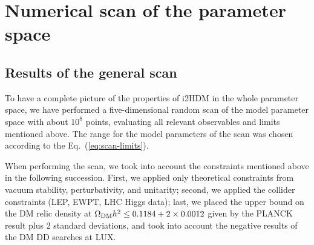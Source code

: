 \documentclass[12pt,a4paper]{article}
\begin{document}
%
\section{Numerical scan of the parameter space\label{sec:num-scan}}

\subsection{Results of the general scan}

To have a complete picture of the properties of i2HDM in the whole parameter space, we have performed a
five-dimensional random scan of the model parameter space with about $10^8$ points, evaluating all relevant
observables and limits mentioned above. The range for 
the model parameters of the scan was chosen according to the Eq.~(\ref{eq:scan-limits}).

When performing the scan, we took into account the constraints mentioned above
in the following succession. First, we applied only theoretical constraints from vacuum stability, 
perturbativity, and unitarity;
second, we applied the collider constraints (LEP, EWPT, LHC Higgs data);
last, we placed the upper bound on the DM relic density at $\Omega_{\rm DM} h^2 \le 0.1184+2\times 0.0012$ 
given by the PLANCK result plus 2 standard deviations, 
and took into account the negative results of the DM DD searches at LUX.
\end{document}

